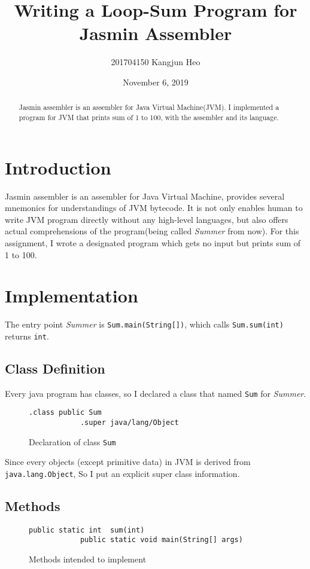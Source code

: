 \documentclass[a4paper, 12pt]{article}
\title{Writing a Loop-Sum Program for Jasmin Assembler}
\date{November 6, 2019}
\author{201704150 Kangjun Heo}
\begin{document}
    \maketitle

    \begin{abstract}
        Jasmin assembler is an assembler for Java Virtual Machine(JVM). I implemented a program for JVM that prints sum of 1 to 100, with the assembler and its language.
    \end{abstract}

    \section{Introduction}
    Jasmin assembler is an assembler for Java Virtual Machine, provides several mnemonics for understandings of JVM bytecode. It is not only enables human to write JVM program directly without any high-level languages, but also offers actual comprehensions of the program(being called \textit{Summer} from now). For this assignment, I wrote a designated program which gets no input but prints sum of 1 to 100.

    \section{Implementation}
    The entry point \textit{Summer} is \texttt{Sum.main(String[])}, which calls \texttt{Sum.sum(int)} returns \texttt{int}.

        \subsection{Class Definition}
        Every java program has classes, so I declared a class that named \texttt{Sum} for \textit{Summer}.
        \begin{figure}[H]
            \begin{lstlisting}[gobble=8]
            .class public Sum
            .super java/lang/Object
            \end{lstlisting}
    
            \centering        
            \caption{Declaration of class \texttt{Sum}}
        \end{figure}
        Since every objects (except primitive data) in JVM is derived from \texttt{java.lang.Object}, So I put an explicit super class information.  

        \subsection{Methods}
        \begin{figure}[H]
            \begin{lstlisting}[gobble=8]
            public static int  sum(int)
            public static void main(String[] args)
            \end{lstlisting}
    
            \centering        
            \caption{Methods intended to implement}
        \end{figure}
\end{document}
